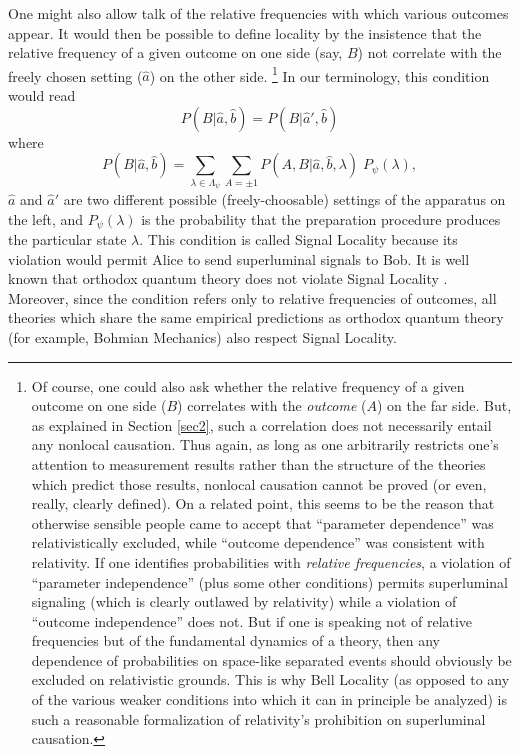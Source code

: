 \documentclass[aps,prc,onecolumn,12pt]{revtex4-2}
\begin{document}
One might also allow talk of the relative frequencies with which
various outcomes appear.  It would then be possible to define
locality by the insistence that the
relative frequency of a given outcome on one side (say, $B$)
not correlate with the freely chosen setting ($\hat{a}$) on the other side.
\footnote{Of course, one could also ask whether the relative frequency
of a given outcome on one side ($B$) correlates with the
\emph{outcome} ($A$) on the far side.  But, as explained in Section
\ref{sec2}, such a correlation does not necessarily entail any
nonlocal causation.  Thus again, as long as one arbitrarily restricts
one's attention to measurement results rather than the structure of
the theories which predict those results, nonlocal causation cannot
be proved (or even, really, clearly defined).  On a related point,
this seems to be the reason that otherwise sensible people came to
accept that ``parameter dependence'' was relativistically excluded,
while ``outcome dependence'' was consistent with relativity.  If one
identifies probabilities with \emph{relative frequencies}, a violation
of ``parameter independence'' (plus some other conditions)
permits superluminal signaling (which
is clearly outlawed by relativity) while a violation of ``outcome
independence'' does not.  But if one is speaking not of relative
frequencies but of the fundamental dynamics of a theory, then any
dependence of probabilities on space-like separated events should
obviously be excluded on relativistic grounds.  This is why Bell
Locality (as opposed to any of the various weaker conditions into
which it can in principle be analyzed) is such a reasonable
formalization of relativity's prohibition on superluminal causation.}
In our terminology, this condition would read
\begin{equation}
P(B|\hat{a},\hat{b}) = P(B|\hat{a}',\hat{b})
\end{equation}
where
\begin{equation}
P(B|\hat{a},\hat{b}) = \sum_{\lambda \in \Lambda_\psi }
\sum_{A = \pm 1} P(A,B|\hat{a},\hat{b},\lambda) \; P_\psi(\lambda),
\end{equation}
$\hat{a}$ and $\hat{a}'$ are two different possible
(freely-choosable) settings of the apparatus on the left,
and $P_\psi(\lambda)$
is the probability that the preparation procedure produces the
particular state $\lambda$.
This condition is called Signal Locality because its
violation would permit Alice to send superluminal signals to Bob.
It is well known that orthodox quantum theory does not violate Signal
Locality \cite{ballentinejarrett}.
Moreover, since the condition refers only to relative
frequencies of outcomes, all theories which share the same empirical
predictions as orthodox quantum theory (for example, Bohmian
Mechanics) also respect Signal Locality.
\end{document}
